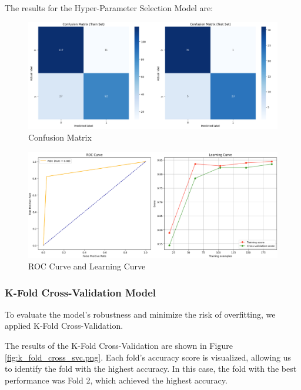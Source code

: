 The results for the Hyper-Parameter Selection Model are:
\begin{figure}[H]
    \centering
    \includegraphics[width=1\linewidth]{images/confusion_matrix_svc_search.png}
    \caption{Confusion Matrix}
    \label{fig:enter-label}
\end{figure}
\begin{figure}[H]
    \centering
    \includegraphics[width=1\linewidth]{images/roc_learning_svc_search.png}
    \caption{ROC Curve and Learning Curve}%
    \label{fig:enter-label}
\end{figure}


\subsubsection{K-Fold Cross-Validation Model}

To evaluate the model's robustness and minimize the risk of overfitting, we applied K-Fold Cross-Validation. 

The results of the K-Fold Cross-Validation are shown in Figure \ref{fig:k_fold_cross_svc.png}. Each fold's accuracy score is visualized, allowing us to identify the fold with the highest accuracy. In this case, the fold with the best performance was Fold 2, which achieved the highest accuracy.

